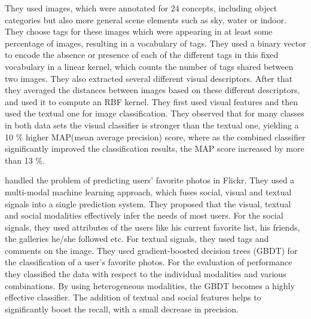 They used images, which were annotated for 24 concepts, including 
object categories but also more general scene elements such as sky, 
water or indoor.  They choose tags for these images which were 
appearing in at least some percentage of  images, resulting in a 
vocabulary of  tags. They used a binary vector  to encode the 
absence or presence of each of the different tags in this fixed 
vocabulary in a linear kernel, which counts the number of tags 
shared between two images. They also extracted several different 
visual descriptors. After that they averaged the distances between 
images based on these different descriptors, and used it to compute 
an RBF kernel. They first used visual features and then used the 
textual one for image classification. They observed  that for many 
classes in both data sets the visual classifier is stronger than the 
textual one, yielding a 10
     $\%$ higher MAP(mean average precision) score, where as the combined  classifier significantly improved the classification results, the MAP score increased by more than 13 $\%$.     



\citet*{vanZwol} handled the problem of predicting users' 
favorite photos in Flickr. They used a multi-modal machine learning 
approach, which fuses social, visual and textual signals into a  
single prediction system. They proposed that the  visual, textual 
and social modalities effectively infer the needs of most users. For 
the social signals, they used attributes of the users like his 
current favorite list, his friends, the galleries he/she followed etc. 
For textual signals, they used tags and comments on the image.
They used gradient-boosted decision trees (GBDT) for the 
classification of a user's favorite photos. For the evaluation of  
performance they classified the data with 
respect to the individual modalities and various combinations. By 
using heterogeneous modalities, the GBDT becomes a highly effective 
classifier. The addition of textual  and social features helps to  
significantly boost the recall, with a small decrease in precision. 



